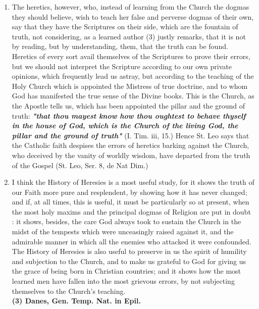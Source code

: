 \documentclass[12pt]{book}
\begin{document}
\begin{enumerate}
\item  The heretics, however, who, instead of learning from the Church the dogmas they should believe, wish
to teach her false and perverse dogmas of their own, say that they have the Scriptures on their side, which
are the fountain of truth, not considering, as a learned author (3) justly remarks, that it is not by reading,
but by understanding, them, that the truth can be found. Heretics of every sort avail themselves of the
Scriptures to prove their errors, but we should not interpret the Scripture according to our own private
opinions, which frequently lead us astray, but according to the teaching of the Holy Church which is
appointed the Mistress of true doctrine, and to whom God has manifested the true sense of the Divine
books. This is the Church, as the Apostle tells us, which has been appointed the pillar and the ground of
truth: \textit{\textbf{"that thou mayest know how thou oughtest to behave thyself in the house of God, which is the
Church of the living God, the pillar and the ground of truth"}} (I. Tim. iii, 15.) Hence St. Leo says that the
Catholic faith despises the errors of heretics barking against the Church, who deceived by the vanity of
worldly wisdom, have departed from the truth of the Gospel (St. Leo, Ser. 8, de Nat Dim.)

\item I think the History of Heresies is a most useful study, for it shows the truth of our Faith more pure
and resplendent, by showing how it has never changed; and if, at all times, this is useful, it must be
particularly so at present, when the most holy maxims and the principal dogmas of Religion are put in
doubt : it shows, besides, the care God always took to sustain the Church in the midst of the tempests
which were unceasingly raised against it, and the admirable manner in which all the enemies who
attacked it were confounded. The History of Heresies is also useful to preserve in us the spirit of humility
and subjection to the Church, and to make us grateful to God for giving us the grace of being born in
Christian countries; and it shows how the most learned men have fallen into the most grievous errors, by
not subjecting themselves to the Church’s teaching.\\
\textbf{(3) Danes, Gen. Temp. Nat. in Epil.}


\end{enumerate}
\end{document}
